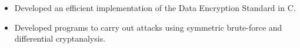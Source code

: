 

\begin{itemize}
    \item Developed an efficient implementation of the Data Encryption Standard in C.
    
    \item Developed programs to carry out attacks using symmetric brute-force and differential cryptanalysis.
\end{itemize}